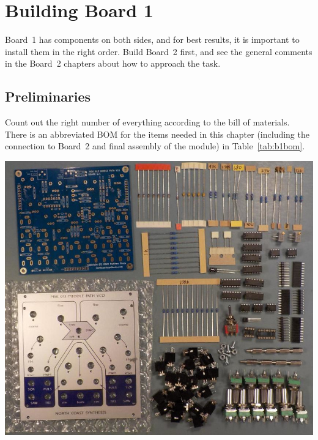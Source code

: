 
%
%
%
%
%
%

\chapter{Building Board 1}\label{ch:board1}

Board~1 has components on both sides, and for best results, it is important
to install them in the right order.  Build Board~2 first, and see the
general comments in the Board~2 chapters about how to approach the task.

\section{Preliminaries}

Count out the right number of everything according to the bill of materials. 
There is an abbreviated BOM for the items needed in this chapter (including
the connection to Board~2 and final assembly of the module) in
Table~\ref{tab:b1bom}.

\nopagebreak
\noindent\includegraphics[width=\linewidth]{board1-parts.jpg}

